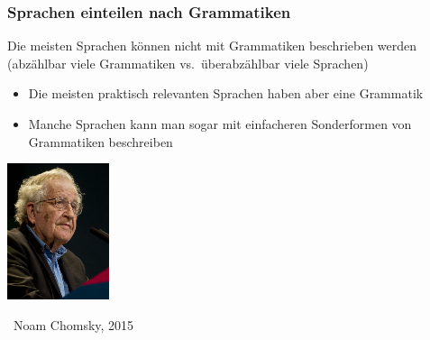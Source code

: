\documentclass[onlymath]{beamer}
\begin{document}

\begin{frame}\frametitle{Sprachen einteilen nach Grammatiken}

Die meisten Sprachen können \alert{nicht} mit Grammatiken beschrieben werden
{\footnotesize (abzählbar viele Grammatiken vs.\ überabzählbar viele Sprachen)}
\bigskip

\begin{itemize}
\item Die meisten \alert{praktisch relevanten} Sprachen haben aber eine Grammatik
\item Manche Sprachen kann man sogar mit einfacheren \alert{Sonderformen von Grammatiken} beschreiben
\end{itemize}
\bigskip

\includegraphics[width=3cm]{images/Noam-Chomsky-2015}
$\;$
\hspace{1mm}
\begin{minipage}{6.0cm}
\vspace{1.8cm}

~{\footnotesize Noam Chomsky, 2015}
\vspace{4.0cm}
\end{minipage}



\end{frame}
\end{document}
